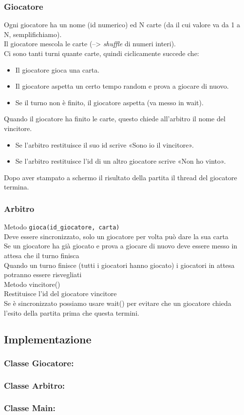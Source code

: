 \subsubsection{Giocatore}
Ogni giocatore ha un nome (id numerico) ed N carte (da il cui valore va da 1 a N, semplifichiamo).
\\Il giocatore mescola le carte (--> \textit{shuffle} di numeri interi).
\\Ci sono tanti turni quante carte, quindi ciclicamente succede che:
\begin{itemize}
    \item Il giocatore gioca una carta.
    \item Il giocatore aspetta un certo tempo random e prova a giocare di nuovo.
    \item Se il turno non è finito, il giocatore aspetta (va messo in wait).
\end{itemize}
Quando il giocatore ha finito le carte, questo chiede all'arbitro il nome del vincitore.
\begin{itemize}
    \item Se l'arbitro restituisce il suo id scrive «Sono io il vincitore».
    \item Se l'arbitro restituisce l'id di un altro giocatore scrive «Non ho vinto».
\end{itemize}
Dopo aver stampato a schermo il risultato della partita il thread del giocatore termina.

\subsubsection{Arbitro}
Metodo \verb#gioca(id_giocatore, carta)#
\\Deve essere sincronizzato, solo un giocatore per volta può dare la sua carta
\\Se un giocatore ha già giocato e prova a giocare di nuovo deve essere messo in attesa che
il turno finisca
\\Quando un turno finisce (tutti i giocatori hanno giocato) i giocatori in attesa potranno
essere risvegliati
\\Metodo vincitore()
\\Restituisce l'id del giocatore vincitore
\\Se è sincronizzato possiamo usare wait() per evitare che un giocatore chieda l'esito della
partita prima che questa termini.

\subsection{Implementazione}
\subsubsection{Classe Giocatore:}

\subsubsection{Classe Arbitro:}

\subsubsection{Classe Main:}

